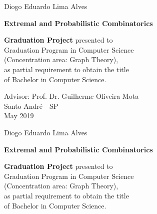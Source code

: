 \documentclass[12pt,twoside,a4paper]{book}
\numberwithin{equation}{section}
\theoremstyle{remark}
\begin{document}
\newpage
\begin{center}
Diogo Eduardo Lima Alves
\end{center}
   \begin{center}
        \vspace*{4 cm}
        \textbf{\Large{Extremal and Probabilistic Combinatorics}}\\
        \vspace*{5cm}
    \end{center}

    \begin{flushright}
{\bf Graduation Project} presented to\\ 
Graduation Program in Computer Science\\ 
(Concentration area: Graph Theory),\\ 
as partial requirement to obtain the title\\ 
of Bachelor in Computer Science.
    \end{flushright}

\vspace{3cm}
\begin{center}
Advisor: Prof. Dr. Guilherme Oliveira Mota\\
\vfill
Santo André - SP\\
May 2019
\end{center}

\pagebreak

\begin{center}
Diogo Eduardo Lima Alves
\end{center}
    
   \begin{center}
        \vspace*{2 cm}
        \textbf{\Large{Extremal and Probabilistic Combinatorics}}\\
        \vspace*{2.5cm}
    \end{center}


    \begin{flushright}
{\bf Graduation Project} presented to\\ 
Graduation Program in Computer Science\\ 
(Concentration area: Graph Theory),\\ 
as partial requirement to obtain the title\\ 
of Bachelor in Computer Science.
    \end{flushright}
    
\end{document}
